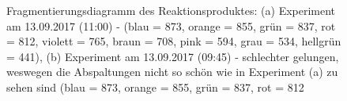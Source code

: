 \begin{figure}[!htbp]
  \caption[Fragmentierungsdiagramm des Reaktionsproduktes von Bo-NCC-1, Quelle: Autor]{Fragmentierungsdiagramm des Reaktionsproduktes: (a) Experiment am 13.09.2017 (11:00) - (blau = 873, orange = 855, grün = 837, rot = 812, violett = 765, braun = 708, pink = 594, grau = 534, hellgrün = 441), (b) Experiment am 13.09.2017 (09:45) - schlechter gelungen, weswegen die Abspaltungen nicht so schön wie in Experiment (a) zu sehen sind (blau = 873, orange = 855, grün = 837, rot = 812}
\end{figure}